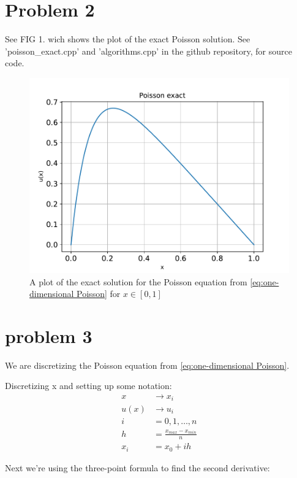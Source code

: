\documentclass[english,notitlepage]{revtex4-1}  %
\begin{document}
\section*{Problem 2}
	See FIG 1. wich shows the plot of the exact Poisson solution. See 'poisson\_exact.cpp' and 'algorithms.cpp' in the github repository, for source code.
	\begin{figure}[H]
		\centering
		\includegraphics[scale=0.55]{plots/poisson_exact.pdf} %
		\caption{A plot of the exact solution for the Poisson equation from \ref{eq:one-dimensional Poisson} for $x \in[0,1]$}
		\label{fig:Exact poisson}
	\end{figure}


\section*{problem 3}
	We are discretizing the Poisson equation from \ref{eq:one-dimensional Poisson}.

	Discretizing x and setting up some notation:
	\begin{equation*}
		\begin{split}
			x &\rightarrow x_i \\
			u(x) &\rightarrow u_i \\
			i &= 0,1,\dots,n \\
			h &= \frac{x_{max} - x_{min}}{n} \\
			x_i &= x_0 + ih 
		\end{split}
	\end{equation*}

Next we're using the three-point formula to find the second derivative: \\
\end{document}
